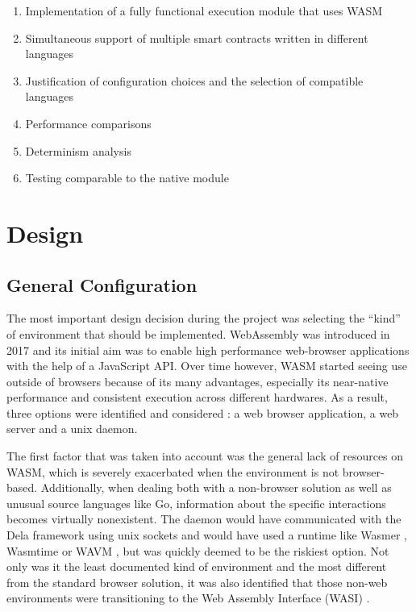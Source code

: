 \documentclass[11pt, a4paper, twoside, openright]{article}
\begin{document}
\begin{enumerate} 

\itemsep0em

 \item Implementation of a fully functional execution module that uses WASM
 \item Simultaneous support of multiple smart contracts written in different languages
 \item Justification of configuration choices and the selection of compatible languages
 \item Performance comparisons
 \item Determinism analysis
 \item Testing comparable to the native module

\end{enumerate} 
\newpage

\section{Design}

\subsection{General Configuration}
The most important design decision during the project was selecting the ``kind'' of environment that should be implemented. WebAssembly was introduced in 2017 and its initial aim was to enable high performance web-browser applications with the help of a JavaScript API. Over time however, WASM started seeing use outside of browsers because of its many advantages, especially its near-native performance and consistent execution across different hardwares. As a result, three options were identified and considered : a web browser application, a web server and a unix daemon.

The first factor that was taken into account was the general lack of resources on WASM, which is severely exacerbated when the environment is not browser-based. Additionally, when dealing both with a non-browser solution as well as unusual source languages like Go, information about the specific interactions becomes virtually nonexistent. The daemon would have communicated with the Dela framework using unix sockets and would have used a runtime like Wasmer \cite{wasmer}, Wasmtime \cite{wasmtime} or WAVM \cite{wavm}, but was quickly deemed to be the riskiest option. Not only was it the least documented kind of environment and the most different from the standard browser solution, it was also identified that those non-web environments were transitioning to the Web Assembly Interface (WASI) \cite{wasi}\cite{announcingwasi}.
\end{document}
